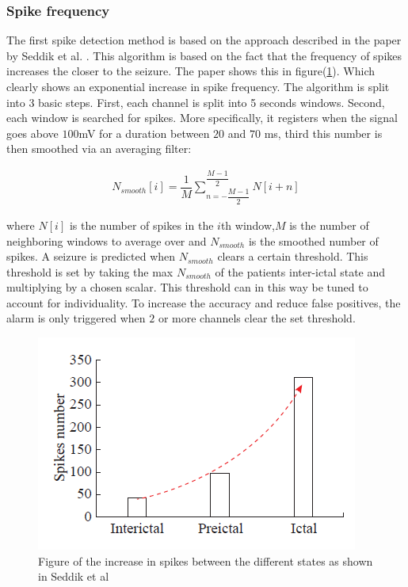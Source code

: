 \subsubsection{Spike frequency}
The first spike detection method is based on the approach described in the paper by Seddik et al. \cite{SpikeDetection}. This algorithm is based on the fact that the frequency of spikes increases the closer to the seizure. The paper shows this in figure(\ref{fig:exponential behavior}). Which clearly shows an exponential increase in spike frequency.
The algorithm is split into 3 basic steps. First, each channel is split into 5 seconds windows. Second, each window is searched for spikes. More specifically, it registers when the signal goes above $100$mV for a duration between $20$ and $70$ ms, third this number is then smoothed via an averaging filter:

\begin{align}
    N_{smooth}[i] = \dfrac{1}{M}\sum_{n=-\dfrac{M-1}{2}}^{\dfrac{M-1}{2}} N[i+n]   
\end{align}

where $N[i]$ is the number of spikes in the $i$th window,$M$ is the number of neighboring windows to average over and $N_{smooth}$ is the smoothed number of spikes. A seizure is predicted when $N_{smooth}$ clears a certain threshold. This threshold is set by taking the max $N_{smooth}$ of the patients inter-ictal state and multiplying by a chosen scalar. This threshold can in this way be tuned to account for individuality. To increase the accuracy and reduce false positives, the alarm is only triggered when $2$ or more channels clear the set threshold.



\begin{figure}
    \centering
    \includegraphics{images/Spike pattern.png}
    \caption{Figure of the increase in spikes between the different states as shown in Seddik et al \cite{SpikeDetection}}
    \label{fig:exponential behavior}
\end{figure}



